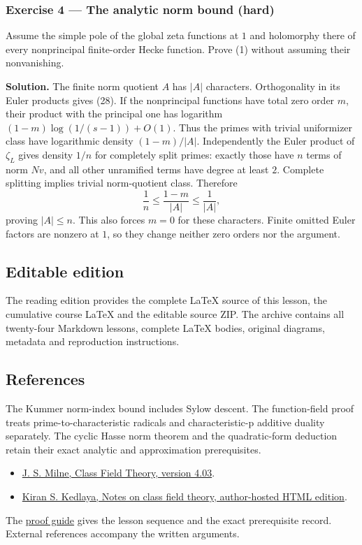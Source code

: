 \documentclass[11pt,a4paper]{article}
\newcommand{\tightlist}{\setlength{\itemsep}{0pt}\setlength{\parskip}{0pt}}
\begin{document}
\subsubsection{Exercise 4 --- The analytic norm bound
(hard)}\label{exercise-4-the-analytic-norm-bound-hard}

Assume the simple pole of the global zeta functions at \(1\) and
holomorphy there of every nonprincipal finite-order Hecke function.
Prove (1) without assuming their nonvanishing.

\textbf{Solution.} The finite norm quotient \(A\) has \(|A|\)
characters. Orthogonality in its Euler products gives (28). If the
nonprincipal functions have total zero order \(m\), their product with
the principal one has logarithm \((1-m)\log(1/(s-1))+O(1)\). Thus the
primes with trivial uniformizer class have logarithmic density
\((1-m)/|A|\). Independently the Euler product of \(\zeta_L\) gives
density \(1/n\) for completely split primes: exactly those have \(n\)
terms of norm \(Nv\), and all other unramified terms have degree at
least \(2\). Complete splitting implies trivial norm-quotient class.
Therefore \[
\frac1n\leq\frac{1-m}{|A|}\leq\frac1{|A|},
\] proving \(|A|\leq n\). This also forces \(m=0\) for these characters.
Finite omitted Euler factors are nonzero at \(1\), so they change
neither zero orders nor the argument.

\subsection{Editable edition}\label{editable-edition}

The reading edition provides the complete LaTeX source of this lesson,
the cumulative course LaTeX and the editable source ZIP. The archive
contains all twenty-four Markdown lessons, complete LaTeX bodies,
original diagrams, metadata and reproduction instructions.

\subsection{References}\label{references}

The Kummer norm-index bound includes Sylow descent. The function-field
proof treats prime-to-characteristic radicals and characteristic-p
additive duality separately. The cyclic Hasse norm theorem and the
quadratic-form deduction retain their exact analytic and approximation
prerequisites.

\begin{itemize}
\tightlist
\item
  \href{https://www.jmilne.org/math/CourseNotes/CFT.pdf}{J. S. Milne,
  Class Field Theory, version 4.03}.
\item
  \href{https://kskedlaya.org/cft/sec_abstractcft1.html}{Kiran S.
  Kedlaya, Notes on class field theory, author-hosted HTML edition}.
\end{itemize}

The \href{../free-proofs.html}{proof guide} gives the lesson sequence
and the exact prerequisite record. External references accompany the
written arguments.
\end{document}
